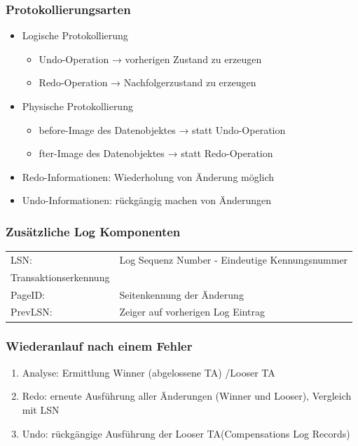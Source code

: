\documentclass[a4paper]{article}
\begin{document}
    \subsubsection{Protokollierungsarten}
    \begin{itemize}
        \item Logische Protokollierung
        
        \begin{itemize}
            \item Undo-Operation → vorherigen Zustand zu erzeugen
            \item Redo-Operation → Nachfolgerzustand zu erzeugen
        \end{itemize}
        
        \item Physische Protokollierung
        
        \begin{itemize}
            \item before-Image des Datenobjektes → statt Undo-Operation
            \item fter-Image des Datenobjektes → statt Redo-Operation
        \end{itemize}
        
        \item Redo-Informationen: Wiederholung von Änderung möglich
        \item Undo-Informationen: rückgängig machen von Änderungen 
    \end{itemize}

    \subsubsection{Zusätzliche Log Komponenten}
    \begin{tabular}{l l}
         LSN: &  Log Sequenz Number - Eindeutige Kennungsnummer\\
         Transaktionserkennung & \\
         PageID: & Seitenkennung der Änderung\\
         PrevLSN: & Zeiger auf vorherigen Log Eintrag
    \end{tabular}
    
    \subsubsection{Wiederanlauf nach einem Fehler}
    \begin{enumerate}
        \item Analyse: Ermittlung Winner (abgelossene TA) /Looser TA
        \item Redo: erneute Ausführung aller Änderungen (Winner und Looser), Vergleich mit LSN
        \item Undo: rückgängige Ausführung der Looser TA(Compensations Log Records)
    \end{enumerate}
\end{document}
